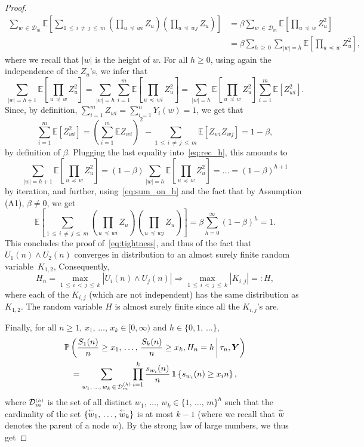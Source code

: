 \documentclass[10pt]{amsart}
\theoremstyle{definition}\newtheorem{defi}[theo]{Definition}\newtheorem{rema}[theo]{Remark}\newtheorem{exam}[theo]{Example}\newtheorem{exem}[theo]{Example}\newtheorem{nota}[theo]{Notation}
\newcommand{\bs}{\ensuremath{\boldsymbol}}
\newcommand{\sss}{\ensuremath{\scriptscriptstyle}}
\newcommand{\parent}{\overset{\sss\leftarrow}}
\newcommand{\bbP}{\mathbb{P}}
\newcommand{\bbE}{\mathbb{E}}
\newcommand{\clD}{\mathcal{D}}
\begin{document}
\begin{proof}
\begin{equation}\label{eq:sum_on_h}
\begin{split}
\sum_{w\,\in\,\clD_m}
\bbE\left[\sum_{1\,\leq\,i\,\neq\,j\,\leq\,m} \left(\prod_{u\,\preccurlyeq\,wi}Z_u\right) \left(\prod_{u\,\preccurlyeq\,wj}Z_u\right)\right] &= \beta \sum_{w\,\in\,\clD_m} \bbE\left[\prod_{u\,\preccurlyeq\, w}Z^2_u\right]\\
&= \beta \sum_{h\,\geq\,0} \sum_{|w|=h} \bbE\left[\prod_{u\,\preccurlyeq\,w}Z^2_u\right],
\end{split}
\end{equation}
where we recall that $|w|$ is the height of $w$. For all $h\geq 0$, using again the independence of the $Z_u$'s, we infer that
\begin{equation}\label{eq:rec_h}
\sum_{|w|=h+1} \bbE\left[\prod_{u\,\preccurlyeq\,w}Z^2_u\right] = \sum_{|w|=h} \sum_{i=1}^m \bbE\left[\prod_{u\,\preccurlyeq\,wi} Z^2_u\right] = \sum_{|w|=h}\bbE\left[\prod_{u\,\preccurlyeq\,w}Z^2_u\right] \sum_{i=1}^m \bbE\left[Z^2_{wi}\right].
\end{equation}
Since, by definition, $\sum_{i=1}^m Z_{wi} = \sum_{i=1}^n Y_i(w) = 1$, we get that
\[
\sum_{i=1}^m \bbE \left[Z^2_{wi}\right] = \left(\sum_{i=1}^m \bbE Z_{wi}\right)^2 - \sum_{1\,\leq\,i\,\neq\,j\,\leq\,m} \bbE \left[Z_{wi}Z_{wj}\right] = 1-\beta,
\]
by definition of $\beta$. Plugging the last equality into~\eqref{eq:rec_h}, this amounts to
\[
\sum_{|w|=h+1} \bbE\left[\prod_{u\,\preccurlyeq\,w}Z^2_u\right] = (1-\beta) \sum_{|w|=h}\bbE\left[\prod_{u\,\preccurlyeq\,w}Z^2_u\right] = \dots = (1-\beta)^{h+1}
\]
by iteration, and further, using~\eqref{eq:sum_on_h} and the fact that by Assumption (A1), $\beta\neq 0$, we get
\[
\bbE\left[\sum_{1\,\leq\,i\,\neq\,j\,\leq\,m} \left(\prod_{u\,\preccurlyeq\,wi}Z_u\right) \left(\prod_{u\,\preccurlyeq\,wj}Z_u\right)\right] = \beta \sum_{h=0}^{\infty} (1-\beta)^h = 1.
\]
This concludes the proof of~\eqref{eq:tightness}, and thus of the fact that $U_1(n)\wedge U_2(n)$ converges in distribution to an almost surely finite random variable~$K_{1,2}$, Consequently,
\[
H_n=\max_{1\,\le\,i\,<\,j\,\le\,k} \left|U_i(n)\wedge U_j(n)\right| \Rightarrow \max_{1\,\le\,i\,<\,j\,\le\,k} \left|K_{i,j}\right|=:H,
\]
where each of the $K_{i,j}$ (which are not independent) has the same distribution as $K_{1,2}.$ The random variable $H$ is almost surely finite since all the $K_{i,j}$'s are.

Finally, for all $n\geq 1$, $x_1, \,\ldots,\, x_k\in [0,\infty)$ and $h\in\{0, 1, \,\ldots\}$,
\begin{multline*}
\bbP\left(\frac{S_1(n)}n\geq x_1, \,\ldots,\, \frac{S_k(n)}n\geq x_k, H_n = h \,\middle|\,\tau_n, \bs Y\right)\\
=\sum_{w_1, \,\ldots,\, w_k\,\in\,\clD_m^{\sss (h)}}
\prod_{i=1}^k \frac{s_{w_i}(n)}n\,\bs 1\left\{s_{w_i}(n)\geq x_i n\right\},
\end{multline*}
where $\clD_m^{\sss (h)}$ is the set of all distinct $w_1,\,\ldots,\, w_k\in\{1, \,\ldots,\, m\}^h$ such that the cardinality of the set $\{\parent w_1, \,\ldots,\, \parent w_k\}$ is at most $k-1$ (where we recall that $\parent w$ denotes the parent of a node $w$). By the strong law of large numbers, we thus get


\end{proof}
\end{document}
